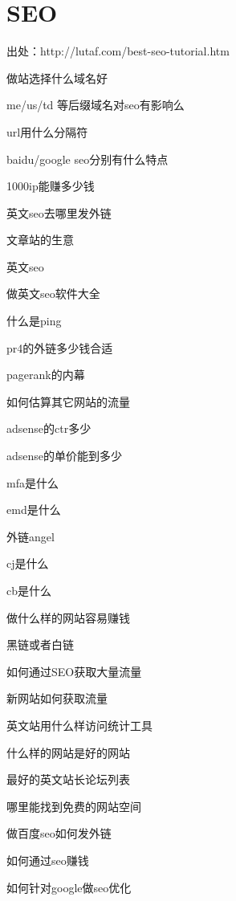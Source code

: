 \chapter{SEO}

出处：http://lutaf.com/best-seo-tutorial.htm

做站选择什么域名好

me/us/td 等后缀域名对seo有影响么

url用什么分隔符

baidu/google seo分别有什么特点

1000ip能赚多少钱

英文seo去哪里发外链

文章站的生意

英文seo

做英文seo软件大全

什么是ping

pr4的外链多少钱合适

pagerank的内幕

如何估算其它网站的流量

adsense的ctr多少

adsense的单价能到多少

mfa是什么

emd是什么

外链angel

cj是什么

cb是什么

做什么样的网站容易赚钱

黑链或者白链

如何通过SEO获取大量流量

新网站如何获取流量

英文站用什么样访问统计工具

什么样的网站是好的网站

最好的英文站长论坛列表

哪里能找到免费的网站空间

做百度seo如何发外链

如何通过seo赚钱

如何针对google做seo优化



\clearpage